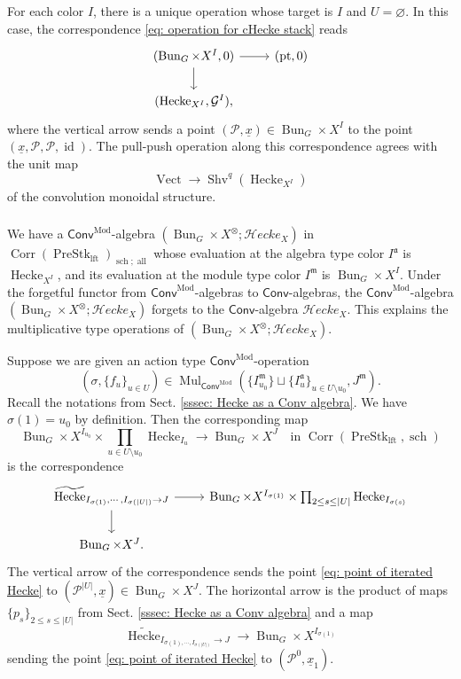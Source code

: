 \documentclass[10pt]{amsart}
\newcommand{\sssec}{\subsubsection}
\theoremstyle{remark}
\newcommand{\mf}[1]{\mathfrak{#1}}
\newcommand{\te}{\text}
\newcommand{\ul}{\underline}
\newcommand{\wt}{\widetilde}
\newcommand{\cP}{\mathcal{P}}
\newcommand{\on}{\operatorname}
\newcommand{\cG}{\mathcal{G}}
\newcommand{\Vect}{\on{Vect}}
\newcommand{\Shv}{\on{Shv}}
\newcommand{\PreStklft}{\on{PreStk}_{\on{lft}}}
\newcommand{\id}{\on{id}}
\newcommand{\pt}{\on{pt}}
\newcommand{\Hecke}{\on{Hecke}}
\newcommand{\Bun}{\on{Bun}}
\newcommand{\Mul}{\on{Mul}}
\newcommand{\Conv}{\mathsf{Conv}}
\newcommand{\ConvMod}{\mathsf{Conv}^{\on{Mod}}}
\newcommand{\cHecke}{\mathcal{H}ecke}
\newcommand{\Corr}{\on{Corr}}
\begin{document}
    For each color $I$, there is a unique operation whose target is $I$ and $U=\varnothing$. In this case, the correspondence  \eqref{eq: operation for cHecke stack} reads
    \begin{equation}\label{eq: pointing cHeckeX}
        \begin{tikzcd}
	{(\Bun_G\times X^I,0)} & {(\pt,0)} \\
	{(\Hecke_{X^I},\cG^I),}
	\arrow[from=1-1, to=1-2]
	\arrow[from=1-1, to=2-1]
\end{tikzcd}
    \end{equation}
where the vertical arrow sends a point $(\cP,\ul{x})\in\Bun_G\times X^I$ to the point $(\ul{x},\cP,\cP,\id)$.
The pull-push operation along this correspondence agrees with the unit map
    \[\Vect\rightarrow \Shv^q(\Hecke_{X^I})\]
    of the convolution monoidal structure.


\sssec{}\label{sssec: a ConvMod algebra Hecke on BunG}
We have a $\ConvMod$-algebra $(\Bun_G\times X^{\otimes}; \cHecke_{X})$ in $\Corr(\PreStklft)_{\on{sch};\on{all}}$ whose evaluation at the algebra type color $I^{\mf{a}}$ is $\Hecke_{X^I}$, and its evaluation at the module type color $I^{\mf{m}}$ is $\Bun_G\times X^I$. Under the forgetful functor from $\ConvMod$-algebras to $\Conv$-algebras, the $\ConvMod$-algebra $(\Bun_G\times X^{\otimes}; \cHecke_{X})$ forgets to the $\Conv$-algebra $\cHecke_X$. This explains the multiplicative type operations of $(\Bun_G\times X^{\otimes}; \cHecke_{X})$.
\medskip

Suppose we are given an action type $\ConvMod$-operation \[(\sigma,\{f_u\}_{u\in U})\in \Mul_{\ConvMod}(\{I^{\mf{m}}_{u_0}\}\sqcup\{I^{\mf{a}}_u\}_{u\in U\setminus u_0}, J^{\mf{m}}).\]
    Recall the notations from Sect. \ref{sssec: Hecke as a Conv algebra}. We have $\sigma(1)=u_0$ by definition. Then the corresponding map
    \[\Bun_G\times X^{I_{u_0}}\times \prod_{u\in U\setminus u_0}\Hecke_{{I_u}}\rightarrow \Bun_G\times X^J \quad \te{in } \Corr(\PreStklft, \on{sch})\]
    is the correspondence
    \begin{equation}\label{eq: Hecke ConvMod correspondence}
        \begin{tikzcd}
	{\wt{\Hecke}_{I_{\sigma(1)},\cdots,I_{\sigma(|U|)}\rightarrow J}} & {\Bun_G\times X^{I_{\sigma(1)}}\times \prod_{2\le s\le |U|}\Hecke_{I_{\sigma(s)}}} \\
	{\Bun_G\times X^J.}
	\arrow[from=1-1, to=1-2]
	\arrow[from=1-1, to=2-1]
\end{tikzcd}
    \end{equation}
     The vertical arrow of the correspondence sends the point \eqref{eq: point of iterated Hecke} to $(\cP^{|U|},\ul{x})\in \Bun_G\times X^J$. The horizontal arrow is the product of maps 
     $\{p_s\}_{2\le s \le |U|}$ from Sect. \ref{sssec: Hecke as a Conv algebra} and a map
     \[\wt{\Hecke}_{I_{\sigma(1),\cdots,I_{\sigma(|U|)}}\rightarrow J}\rightarrow \Bun_G\times X^{I_{\sigma(1)}}\]
    sending the point \eqref{eq: point of iterated Hecke} to $(\cP^{0},\ul{x}_{1})$.
\medskip
\end{document}
